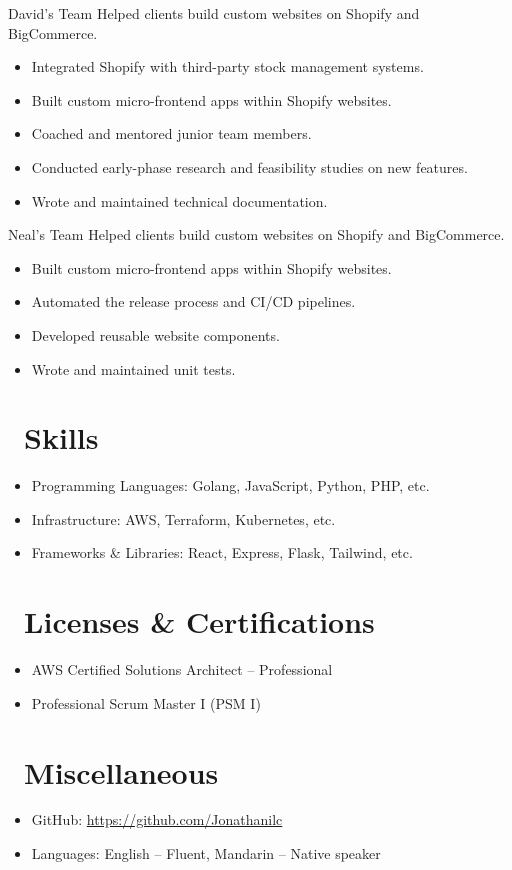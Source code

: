 \documentclass{resume}
\begin{document}
 {David's Team}
Helped clients build custom websites on Shopify and BigCommerce.
\begin{itemize}
  \item Integrated Shopify with third-party stock management systems.
  \item Built custom micro-frontend apps within Shopify websites.
  \item Coached and mentored junior team members.
  \item Conducted early-phase research and feasibility studies on new features.
  \item Wrote and maintained technical documentation.
\end{itemize}

 {Neal's Team}
Helped clients build custom websites on Shopify and BigCommerce.
\begin{itemize}
  \item Built custom micro-frontend apps within Shopify websites.
  \item Automated the release process and CI/CD pipelines.
  \item Developed reusable website components.
  \item Wrote and maintained unit tests.
\end{itemize}

\section{\faCogs\ Skills}
\begin{itemize}[parsep=0.5ex]
  \item Programming Languages: Golang, JavaScript, Python, PHP, etc.
  \item Infrastructure: AWS, Terraform, Kubernetes, etc.
  \item Frameworks \& Libraries: React, Express, Flask, Tailwind, etc.
\end{itemize}

\section{\faHeartO\ Licenses \& Certifications}
\begin{itemize}[parsep=0.5ex]
  \item AWS Certified Solutions Architect – Professional
  \item Professional Scrum Master I (PSM I)
\end{itemize}


\section{\faInfo\ Miscellaneous}
\begin{itemize}[parsep=0.5ex]
  \item GitHub: \url{https://github.com/Jonathanilc}
  \item Languages: English – Fluent, Mandarin – Native speaker
\end{itemize}

%
%
\end{document}
